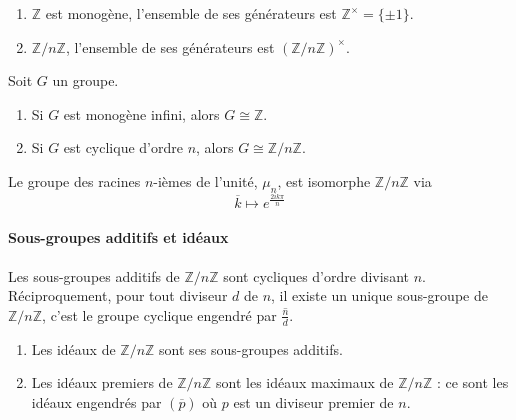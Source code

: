 
  \begin{proposition}
    \begin{enumerate}[label={\bfseries(\roman*)}]
      \item $\mathbb{Z}$ est monogène, l'ensemble de ses générateurs est $\mathbb{Z}^\times = \{ \pm 1 \}$.
      \item $\mathbb{Z}/n\mathbb{Z}$, l'ensemble de ses générateurs est $(\mathbb{Z}/n\mathbb{Z})^\times$.
    \end{enumerate}
  \end{proposition}

  \begin{corollary}
    Soit $G$ un groupe.
    \begin{enumerate}[label={\bfseries(\roman*)}]
      \item Si $G$ est monogène infini, alors $G \cong \mathbb{Z}$.
      \item Si $G$ est cyclique d'ordre $n$, alors $G \cong \mathbb{Z}/n\mathbb{Z}$.
    \end{enumerate}
  \end{corollary}

  \begin{example}
    Le groupe des racines $n$-ièmes de l'unité, $\mu_n$, est isomorphe $\mathbb{Z}/n\mathbb{Z}$ via
    \[ \overline{k} \mapsto e^{\frac{2ik\pi}{n}} \]
  \end{example}

  \paragraph{Sous-groupes additifs et idéaux}


  \begin{theorem}
    Les sous-groupes additifs de $\mathbb{Z}/n\mathbb{Z}$ sont cycliques d'ordre divisant $n$. Réciproquement, pour tout diviseur $d$ de $n$, il existe un unique sous-groupe de $\mathbb{Z}/n\mathbb{Z}$, c'est le groupe cyclique engendré par $\overline{\frac{n}{d}}$.
  \end{theorem}


  \begin{theorem}
    \begin{enumerate}[label={\bfseries(\roman*)}]
      \item Les idéaux de $\mathbb{Z}/n\mathbb{Z}$ sont ses sous-groupes additifs.
      \item Les idéaux premiers de $\mathbb{Z}/n\mathbb{Z}$ sont les idéaux maximaux de $\mathbb{Z}/n\mathbb{Z}$ : ce sont les idéaux engendrés par $(\overline{p})$ où $p$ est un diviseur premier de $n$.
    \end{enumerate}
  \end{theorem}

